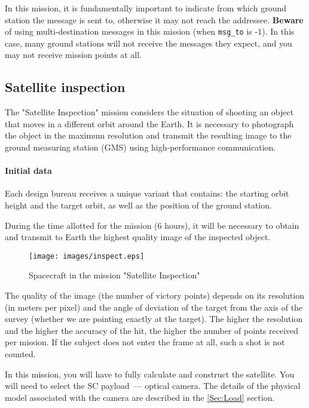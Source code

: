 \documentclass[12pt,a4paper]{article}
\begin{document}
In this mission, it is fundamentally important to indicate from which ground station the message is sent to, otherwise it may not reach the addressee. \textbf{Beware} of using multi-destination messages in this mission (when \verb'msg_to' is -1). In this case, many ground stations will not receive the messages they expect, and you may not receive mission points at all.

\subsection{Satellite inspection}

The "Satellite Inspection" mission considers the situation of shooting an object that moves in a different orbit around the Earth. It is necessary to photograph the object in the maximum resolution and transmit the resulting image to the ground measuring station (GMS) using high-performance communication.

\paragraph{Initial data}

Each design bureau receives a unique variant that contains: the starting orbit height and the target orbit, as well as the position of the ground station.

During the time allotted for the mission (6 hours), it will be necessary to obtain and transmit to Earth the highest quality image of the inspected object.

\begin{figure}[tbh]
  \begin{center}
    \texttt{[image: images/inspect.eps]}
    \caption{Spacecraft in the mission "Satellite Inspection"}
    \label{Pic:SMS}
  \end{center}
\end{figure}

The quality of the image (the number of victory points) depends on its resolution (in meters per pixel) and the angle of deviation of the target from the axis of the survey (whether we are pointing exactly at the target). The higher the resolution and the higher the accuracy of the hit, the higher the number of points received per mission. If the subject does not enter the frame at all, such a shot is not counted.

In this mission, you will have to fully calculate and construct the satellite. You will need to select the SC payload~--- optical camera. The details of the physical model associated with the camera are described in the \ref{Sec:Load} section.
\end{document}
